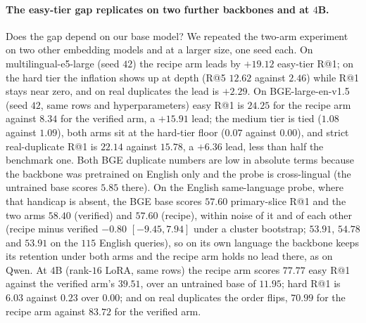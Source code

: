 \paragraph{The easy-tier gap replicates on two further backbones and at $4$B.}
Does the gap depend on our base model? We repeated the two-arm experiment on two other embedding models and at a larger size, one seed each. On multilingual-e5-large (seed $42$) the recipe arm leads by $+19.12$ easy-tier R@1; on the hard tier the inflation shows up at depth (R@5 $12.62$ against $2.46$) while R@1 stays near zero, and on real duplicates the lead is $+2.29$. On BGE-large-en-v1.5 (seed $42$, same rows and hyperparameters) easy R@1 is $24.25$ for the recipe arm against $8.34$ for the verified arm, a $+15.91$ lead; the medium tier is tied ($1.08$ against $1.09$), both arms sit at the hard-tier floor ($0.07$ against $0.00$), and strict real-duplicate R@1 is $22.14$ against $15.78$, a $+6.36$ lead, less than half the benchmark one. Both BGE duplicate numbers are low in absolute terms because the backbone was pretrained on English only and the probe is cross-lingual (the untrained base scores $5.85$ there). On the English same-language probe, where that handicap is absent, the BGE base scores $57.60$ primary-slice R@1 and the two arms $58.40$ (verified) and $57.60$ (recipe), within noise of it and of each other (recipe minus verified $-0.80$ $[-9.45, 7.94]$ under a cluster bootstrap; $53.91$, $54.78$ and $53.91$ on the $115$ English queries), so on its own language the backbone keeps its retention under both arms and the recipe arm holds no lead there, as on Qwen. At $4$B (rank-$16$ LoRA, same rows) the recipe arm scores $77.77$ easy R@1 against the verified arm's $39.51$, over an untrained base of $11.95$; hard R@1 is $6.03$ against $0.23$ over $0.00$; and on real duplicates the order flips, $70.99$ for the recipe arm against $83.72$ for the verified arm.

